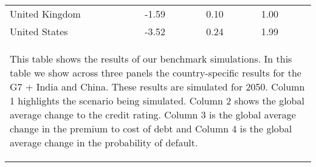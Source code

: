\begin{table}[tb!]
\begin{tabularx}{\textwidth}{X X X X}
United Kingdom &  -1.59  &  0.10  &  1.00 \\
United States &  -3.52  &  0.24  &  1.99 \\
\hline
\multicolumn{4}{p{\textwidth}}{\begin{footnotesize}This table shows the results of our benchmark simulations. In this table we show across three panels the country-specific results for the G7 + India and China. These results are simulated for 2050. Column 1 highlights the scenario being simulated. Column 2 shows the global average change to the credit rating. Column 3 is the global average change in the premium to cost of debt and Column 4 is the global average change in the probability of default.
\end{footnotesize}
}
\end{tabularx}
\end{table}
